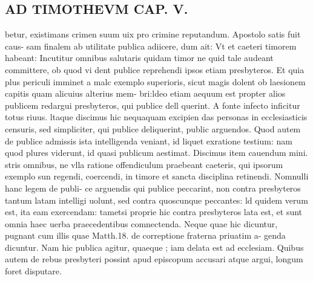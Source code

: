 \documentclass{article}
\begin{document}
\begin{pages}
\section*{AD TIMOTHEVM CAP. V. }
\marginpar{[ p.115 ]}\pstart betur, existimans crimen suum uix pro crimine reputandum. Apostolo satis fuit caus- sam finalem ab utilitate publica adiicere, dum ait: Vt et caeteri timorem habeant: Incutitur omnibus salutaris quidam timor ne quid tale audeant committere, ob quod vi dent publice reprehendi ipsos etiam presbyteros. Et quia plus periculi imminet a malc exemplo superioris, sicut magis dolent ob laesionem capitis quam alicuius alterius mem- bri:ldeo etiam aequum est propter alios publicem redargui presbyteros, qui publice dell querint. A fonte infecto inficitur totus riuus. ltaque discimus hic nequaquam excipien das personas in ecclesiasticis censuris, sed simpliciter, qui publice deliquerint, public arguendos. Quod autem de publice admissis ista intelligenda veniant, id liquet exratione testium: nam quod plures viderunt, id quasi publicum aestimat. Discimus item cauendum mini. stris omnibus, ne vlla ratione offendiculum praebeant caeteris, qui ipsorum exemplo sun regendi, coercendi, in timore et sancta disciplina retinendi. Nomnulli hanc legem de publi- ce arguendis qui publice peccarint, non contra presbyteros tantum latam intelligi uolunt, sed contra quoscunque peccantes: ld quidem verum est, ita eam exercendam: tametsi proprie hic contra presbyteros lata est, et sunt omnia haec uerba praecedentibus comnectenda. Neque  quae hic dicuntur, pugnant cum illis quae Matth.18. de correptione fraterna priuatim a- genda dicuntur. Nam hic publica agitur, quaeque ; iam delata est ad ecclesiam. Quibus autem de rebus presbyteri possint apud episcopum accusari atque argui, longum foret disputare.  \pend
{}
{}

\end{pages}
\end{document}
